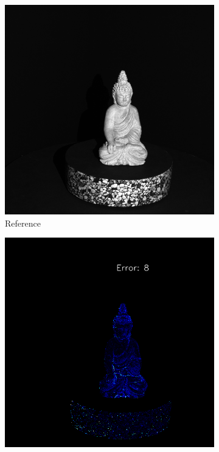 \begin{figure}[H]
	
	\begin{subfigure}[b]{0.24\linewidth}
		\includegraphics[width=\linewidth]{./Figures/comparison_real/00008.image0.png}
		\caption{Reference}
	\end{subfigure}
	\begin{subfigure}[b]{0.24\linewidth}
		\includegraphics[width=\linewidth]{./Figures/comparison_real/fancy_eval_0_error_SVD.png}

\end{subfigure}
\end{figure}
